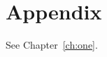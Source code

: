 \documentclass[twoside,openright]{book}\listfiles
\begin{document}
\frontmatter\tableofcontents\mainmatter

\appendix\chapter{Appendix}See Chapter~\ref{ch:one}.
\end{document}
